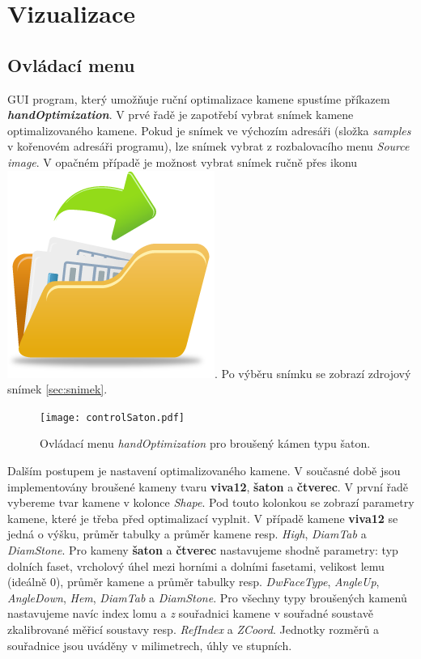 \section{Vizualizace}

\subsection{Ovládací menu}
\label{sec:ovladaci menu}
GUI program, který umožňuje ruční optimalizace kamene spustíme příkazem \textbf{\textit{handOptimization}}. V prvé řadě je zapotřebí vybrat snímek kamene optimalizovaného kamene. Pokud je snímek ve výchozím adresáři (složka \textit{samples} v kořenovém adresáři programu), lze snímek vybrat z rozbalovacího menu \textit{Source image}. V opačném případě je možnost vybrat snímek ručně přes ikonu \includegraphics[width = .35cm]{icons/open-file-icon.png}. Po výběru snímku se zobrazí zdrojový snímek \ref{sec:snimek}.

\begin{figure}
\centering
\texttt{[image: controlSaton.pdf]}
	
\caption[Ruční optimalizace: ovládací menu pro šaton.]{Ovládací menu \textit{handOptimization} pro broušený kámen typu šaton.}
\label{figure:kamera}
\end{figure}


Dalším postupem je nastavení optimalizovaného kamene. V současné době jsou implementovány broušené kameny tvaru \textbf{viva12}, \textbf{šaton} a \textbf{čtverec}. V první řadě vybereme tvar kamene v kolonce \textit{Shape}. Pod touto kolonkou se zobrazí parametry kamene, které je třeba před optimalizací vyplnit. V případě kamene \textbf{viva12} se jedná o výšku, průměr tabulky a průměr kamene resp. \textit{High}, \textit{DiamTab} a \textit{DiamStone}. Pro kameny \textbf{šaton} a \textbf{čtverec} nastavujeme shodně parametry: typ dolních faset, vrcholový úhel mezi horními a dolními fasetami, velikost lemu (ideálně 0), průměr kamene a průměr tabulky resp. \textit{DwFaceType}, \textit{AngleUp}, \textit{AngleDown}, \textit{Hem}, \textit{DiamTab} a \textit{DiamStone}. Pro všechny typy broušených kamenů nastavujeme navíc index lomu a \textit{z} souřadnici kamene v souřadné soustavě zkalibrované měřicí soustavy resp. \textit{RefIndex} a \textit{ZCoord}. Jednotky rozměrů a souřadnice jsou uváděny v milimetrech, úhly ve stupních. 

